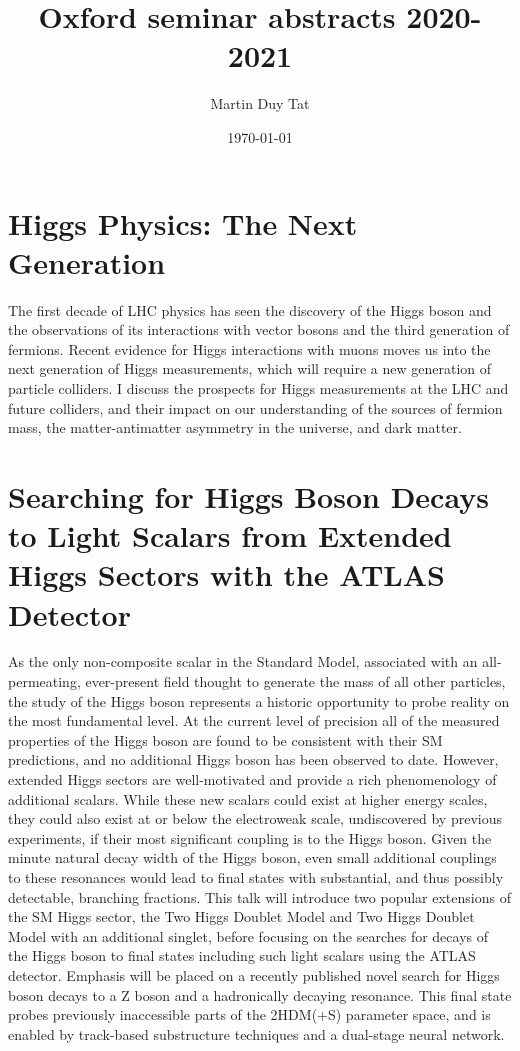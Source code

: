 \documentclass[12pt, a4paper, notitlepage, onecolumn]{article}
\title{Oxford seminar abstracts 2020-2021}
\author{Martin Duy Tat}
\date{\today}
\begin{document}
\maketitle
\section{Higgs Physics: The Next Generation}
\noindent The first decade of LHC physics has seen the discovery of the Higgs boson and the observations of its interactions with vector bosons and the third generation of fermions.  Recent evidence for Higgs interactions with muons moves us into the next generation of Higgs measurements, which will require a new generation of particle colliders.  I discuss the prospects for Higgs measurements at the LHC and future colliders, and their impact on our understanding of the sources of fermion mass, the matter-antimatter asymmetry in the universe, and dark matter.

\section{Searching for Higgs Boson Decays to Light Scalars from Extended Higgs Sectors with the ATLAS Detector}
\noindent As the only non-composite scalar in the Standard Model, associated with an all-permeating, ever-present field thought to generate the mass of all other particles, the study of the Higgs boson represents a historic opportunity to probe reality on the most fundamental level. At the current level of precision all of the measured properties of the Higgs boson are found to be consistent with their SM predictions, and no additional Higgs boson has been observed to date. However, extended Higgs sectors are well-motivated and provide a rich phenomenology of additional scalars. While these new scalars could exist at higher energy scales, they could also exist at or below the electroweak scale, undiscovered by previous experiments, if their most significant coupling is to the Higgs boson. Given the minute natural decay width of the Higgs boson, even small additional couplings to these resonances would lead to final states with substantial, and thus possibly detectable, branching fractions. This talk will introduce two popular extensions of the SM Higgs sector, the Two Higgs Doublet Model and Two Higgs Doublet Model with an additional singlet, before focusing on the searches for decays of the Higgs boson to final states including such light scalars using the ATLAS detector. Emphasis will be placed on a recently published novel search for Higgs boson decays to a Z boson and a hadronically decaying resonance. This final state probes previously inaccessible parts of the 2HDM(+S) parameter space, and is enabled by track-based substructure techniques and a dual-stage neural network.
\end{document}

